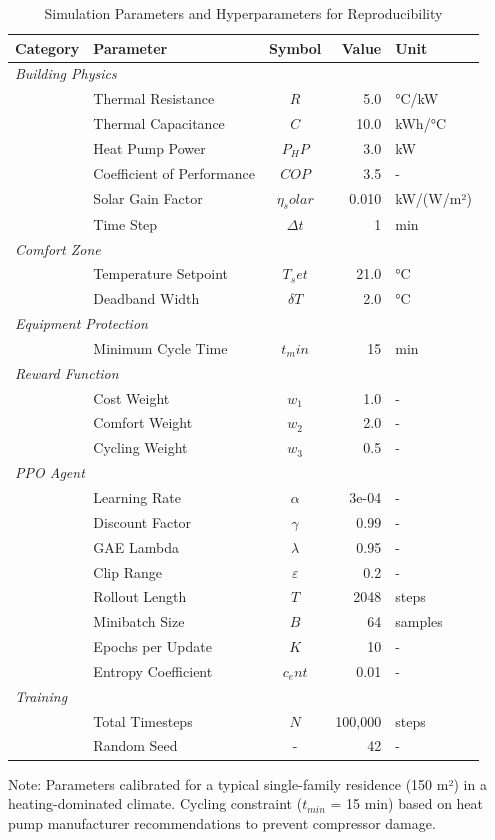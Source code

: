 
\begin{table}[htbp]
\centering
\caption{Simulation Parameters and Hyperparameters for Reproducibility}
\label{tab:parameters}
\small
\begin{tabular}{llcrl}
\toprule
\textbf{Category} & \textbf{Parameter} & \textbf{Symbol} & \textbf{Value} & \textbf{Unit} \\
\midrule
\multicolumn{5}{l}{\textit{Building Physics}} \\
& Thermal Resistance & $R$ & 5.0 & °C/kW \\
& Thermal Capacitance & $C$ & 10.0 & kWh/°C \\
& Heat Pump Power & $P_HP$ & 3.0 & kW \\
& Coefficient of Performance & $COP$ & 3.5 & - \\
& Solar Gain Factor & $η_solar$ & 0.010 & kW/(W/m²) \\
& Time Step & $Δt$ & 1 & min \\
\midrule
\multicolumn{5}{l}{\textit{Comfort Zone}} \\
& Temperature Setpoint & $T_set$ & 21.0 & °C \\
& Deadband Width & $δT$ & 2.0 & °C \\
\midrule
\multicolumn{5}{l}{\textit{Equipment Protection}} \\
& Minimum Cycle Time & $t_min$ & 15 & min \\
\midrule
\multicolumn{5}{l}{\textit{Reward Function}} \\
& Cost Weight & $w_1$ & 1.0 & - \\
& Comfort Weight & $w_2$ & 2.0 & - \\
& Cycling Weight & $w_3$ & 0.5 & - \\
\midrule
\multicolumn{5}{l}{\textit{PPO Agent}} \\
& Learning Rate & $α$ & 3e-04 & - \\
& Discount Factor & $γ$ & 0.99 & - \\
& GAE Lambda & $λ$ & 0.95 & - \\
& Clip Range & $ε$ & 0.2 & - \\
& Rollout Length & $T$ & 2048 & steps \\
& Minibatch Size & $B$ & 64 & samples \\
& Epochs per Update & $K$ & 10 & - \\
& Entropy Coefficient & $c_ent$ & 0.01 & - \\
\midrule
\multicolumn{5}{l}{\textit{Training}} \\
& Total Timesteps & $N$ & 100,000 & steps \\
& Random Seed & - & 42 & - \\

\bottomrule
\end{tabular}
\begin{tablenotes}
\small
\item Note: Parameters calibrated for a typical single-family residence (150 m²) 
in a heating-dominated climate. Cycling constraint ($t_{min}$ = 15 min) based on 
heat pump manufacturer recommendations to prevent compressor damage.
\end{tablenotes}
\end{table}
